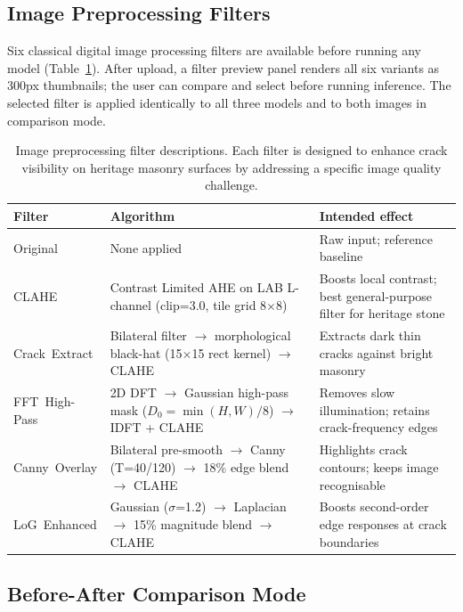 \documentclass[12pt,a4paper]{article}
\begin{document}
\subsection{Image Preprocessing Filters}

Six classical digital image processing filters are available before running any model (Table~\ref{tab:filters}). After upload, a filter preview panel renders all six variants as 300px thumbnails; the user can compare and select before running inference. The selected filter is applied identically to all three models and to both images in comparison mode.

\begin{table}[H]
\centering
\caption{Image preprocessing filter descriptions. Each filter is designed to enhance crack visibility on heritage masonry surfaces by addressing a specific image quality challenge.}
\label{tab:filters}
\begin{tabular}{p{2.9cm}p{5.0cm}p{3.8cm}}
\toprule
\rowcolor{white}
\textbf{Filter} & \textbf{Algorithm} & \textbf{Intended effect} \\
\midrule
Original & None applied & Raw input; reference baseline \\
CLAHE & Contrast Limited AHE on LAB L-channel (clip=3.0, tile grid 8$\times$8) & Boosts local contrast; best general-purpose filter for heritage stone \\
\mbox{Crack Extract} & Bilateral filter $\to$ morphological black-hat (15$\times$15 rect kernel) $\to$ CLAHE & Extracts dark thin cracks against bright masonry \\
\mbox{FFT High-Pass} & 2D DFT $\to$ Gaussian high-pass mask ($D_0 = \min(H,W)/8$) $\to$ IDFT + CLAHE & Removes slow illumination; retains crack-frequency edges \\
\mbox{Canny Overlay} & Bilateral pre-smooth $\to$ Canny (T=40/120) $\to$ 18\% edge blend $\to$ CLAHE & Highlights crack contours; keeps image recognisable \\
\mbox{LoG Enhanced} & Gaussian ($\sigma$=1.2) $\to$ Laplacian $\to$ 15\% magnitude blend $\to$ CLAHE & Boosts second-order edge responses at crack boundaries \\
\bottomrule
\end{tabular}
\end{table}

\subsection{Before-After Comparison Mode}
\end{document}
